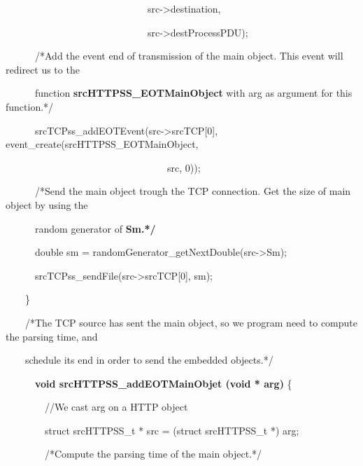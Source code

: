 \documentclass[a4paper]{article}
\begin{document}
{
\ \ \ \ \ \ \ \ \ \ \ \ \ \ \ \ \ \ \ \ \ \ \ \ \ \ \ \ \ src-{\textgreater}destination,}

{
\ \ \ \ \ \ \ \ \ \ \ \ \ \ \ \ \ \ \ \ \ \ \ \ \ \ \ \ \ src-{\textgreater}destProcessPDU);}

\bigskip

{
\ \ \ \ \ \ /*Add the event end of transmission of the main object. This event will redirect us to the}

{
\ \ \ \ \ \ function \textbf{srcHTTPSS\_EOTMainObject} with arg as argument for this function.*/}

{
\ \ \ \ \ \ srcTCPss\_addEOTEvent(src-{\textgreater}srcTCP[0], event\_create(srcHTTPSS\_EOTMainObject,}

{
\ \ \ \ \ \ \ \ \ \ \ \ \ \ \ \ \ \ \ \ \ \ \ \ \ \ \ \ \ \ \ \ \ src, 0));}

\bigskip

{
\ \ \ \ \ \ /*Send the main object trough the TCP connection. Get the size of main object by using the}

{
\ \ \ \ \ \ random generator of \textbf{Sm.*/}}

{
\ \ \ \ \ \ double sm = randomGenerator\_getNextDouble(src-{\textgreater}Sm);}

{
\ \ \ \ \ \ srcTCPss\_sendFile(src-{\textgreater}srcTCP[0], sm);}

{
\ \ \ \ \}}

\pagebreak

{
\ \ \ \ /*The TCP source has sent the main object, so we program need to compute the parsing time, and}

{
\ \ \ \ schedule its end in order to send the embedded objects.*/}

{
\ \ \ \ \ \ \textbf{void srcHTTPSS\_addEOTMainObjet (void * arg)} \{}

\bigskip

{
\ \ \ \ \ \ \ \ //We cast arg on a HTTP object}

{
\ \ \ \ \ \ \ \ struct srcHTTPSS\_t * src = (struct srcHTTPSS\_t *) arg;}

\bigskip

{
\ \ \ \ \ \ \ \ /*Compute the parsing time of the main object.*/}
\end{document}

